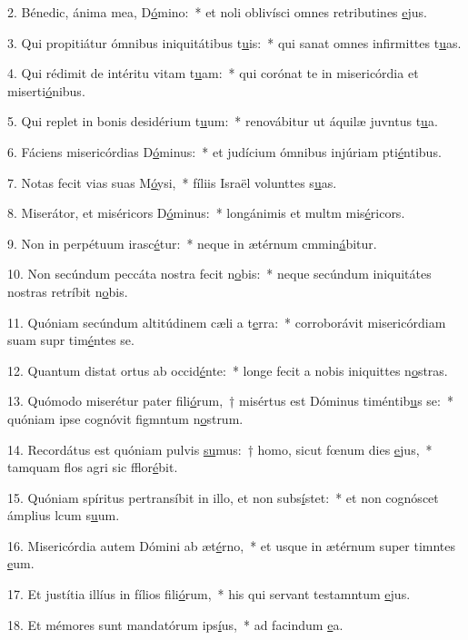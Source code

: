 2. Bénedic, ánima mea, D\uline{ó}mino:~* et noli oblivísci omnes retributines \uline{e}jus.\par 
3. Qui propitiátur ómnibus iniquitátibus t\uline{u}is:~* qui sanat omnes infirmittes t\uline{u}as.\par 
4. Qui rédimit de intéritu vitam t\uline{u}am:~* qui corónat te in misericórdia et miserti\uline{ó}nibus.\par 
5. Qui replet in bonis desidérium t\uline{u}um:~* renovábitur ut áquilæ juvntus t\uline{u}a.\par 
6. Fáciens misericórdias D\uline{ó}minus:~* et judícium ómnibus injúriam pti\uline{é}ntibus.\par 
7. Notas fecit vias suas M\uline{ó}ysi,~* fíliis Israël volunttes s\uline{u}as.\par 
8. Miserátor, et miséricors D\uline{ó}minus:~* longánimis et multm mis\uline{é}ricors.\par 
9. Non in perpétuum irasc\uline{é}tur:~* neque in ætérnum cmmin\uline{á}bitur.\par 
10. Non secúndum peccáta nostra fecit n\uline{o}bis:~* neque secúndum iniquitátes nostras retríbit n\uline{o}bis.\par 
11. Quóniam secúndum altitúdinem cæli a t\uline{e}rra:~* corroborávit misericórdiam suam supr tim\uline{é}ntes se.\par 
12. Quantum distat ortus ab occid\uline{é}nte:~* longe fecit a nobis iniquittes n\uline{o}stras.\par 
13. Quómodo miserétur pater fili\uline{ó}rum,~† misértus est Dóminus timéntib\uline{u}s se:~* quóniam ipse cognóvit figmntum n\uline{o}strum.\par 
14. Recordátus est quóniam pulvis \uline{su}mus:~† homo, sicut fœnum dies \uline{e}jus,~* tamquam flos agri sic fflor\uline{é}bit.\par 
15. Quóniam spíritus pertransíbit in illo, et non subs\uline{í}stet:~* et non cognóscet ámplius lcum s\uline{u}um.\par 
16. Misericórdia autem Dómini ab æt\uline{é}rno,~* et usque in ætérnum super timntes \uline{e}um.\par 
17. Et justítia illíus in fílios fili\uline{ó}rum,~* his qui servant testamntum \uline{e}jus.\par 
18. Et mémores sunt mandatórum ips\uline{í}us,~* ad facindum \uline{e}a.\par 
